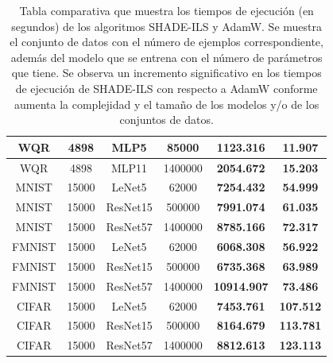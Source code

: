\begin{table}[]
{\begin{tabular}{|c|c|c|c|c|c|}
WQR               & 4898                & MLP5            & 85000                  & \textbf{1123.316}  & \textbf{11.907}  \\ \hline
WQR               & 4898                & MLP11           & 1400000                & \textbf{2054.672}  & \textbf{15.203}  \\ \hline
MNIST             & 15000               & LeNet5          & 62000                  & \textbf{7254.432}  & \textbf{54.999}  \\ \hline
MNIST             & 15000               & ResNet15        & 500000                 & \textbf{7991.074}  & \textbf{61.035}  \\ \hline
MNIST             & 15000               & ResNet57        & 1400000                & \textbf{8785.166}  & \textbf{72.317}  \\ \hline
FMNIST            & 15000               & LeNet5          & 62000                  & \textbf{6068.308}  & \textbf{56.922}  \\ \hline
FMNIST            & 15000               & ResNet15        & 500000                 & \textbf{6735.368}  & \textbf{63.989}  \\ \hline
FMNIST            & 15000               & ResNet57        & 1400000                & \textbf{10914.907} & \textbf{73.486}  \\ \hline
CIFAR             & 15000               & LeNet5          & 62000                  & \textbf{7453.761}  & \textbf{107.512} \\ \hline
CIFAR             & 15000               & ResNet15        & 500000                 & \textbf{8164.679}  & \textbf{113.781} \\ \hline
CIFAR             & 15000               & ResNet57        & 1400000                & \textbf{8812.613}  & \textbf{123.113} \\ \hline
\end{tabular}}
\caption[Comparación de tiempos entre los algoritmos SHADE-ILS y AdamW]{Tabla comparativa que muestra los tiempos de ejecución (en segundos) de los algoritmos SHADE-ILS y AdamW. Se muestra el conjunto de datos con el número de ejemplos correspondiente, además del modelo que se entrena con el número de parámetros que tiene. Se observa un incremento significativo en los tiempos de ejecución de SHADE-ILS con respecto a AdamW conforme aumenta la complejidad y el tamaño de los modelos y/o de los conjuntos de datos.}
\label{tab:tiempos}
\end{table}


